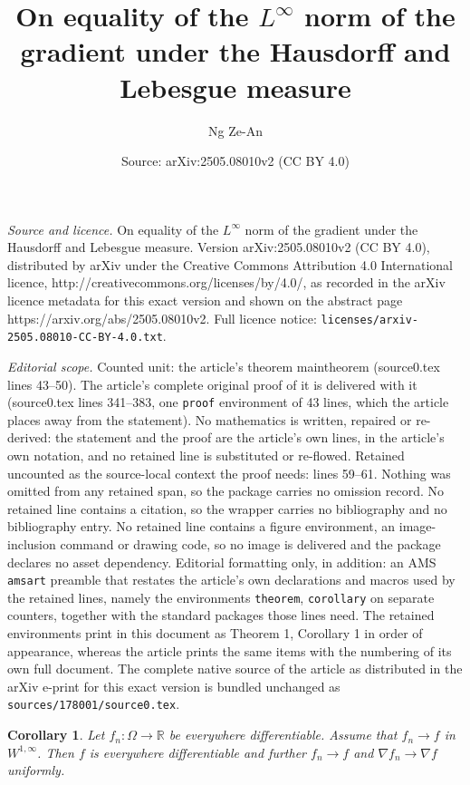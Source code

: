 \documentclass[10pt,a4paper]{amsart}
\title{On equality of the $L^\infty$ norm of the gradient under the Hausdorff and Lebesgue measure}
\author{Ng Ze-An}
\date{Source: arXiv:2505.08010v2 (CC BY 4.0)}
\newtheorem{corollary}{Corollary}
\begin{document}
\maketitle

\noindent\emph{Source and licence.} On equality of the $L^\infty$ norm of the gradient under the Hausdorff and Lebesgue measure. Version arXiv:2505.08010v2 (CC BY 4.0), distributed by arXiv under the Creative Commons Attribution 4.0 International licence, http://creativecommons.org/licenses/by/4.0/, as recorded in the arXiv licence metadata for this exact version and shown on the abstract page https://arxiv.org/abs/2505.08010v2. Full licence notice: \texttt{licenses/arxiv-2505.08010-CC-BY-4.0.txt}.\par\smallskip

\noindent\textit{Editorial scope.} Counted unit: the article's theorem maintheorem (source0.tex lines 43--50). The article's complete original proof of it is delivered with it (source0.tex lines 341--383, one \texttt{proof} environment of 43 lines, which the article places away from the statement). No mathematics is written, repaired or re-derived: the statement and the proof are the article's own lines, in the article's own notation, and no retained line is substituted or re-flowed.  Retained uncounted as the source-local context the proof needs: lines 59--61.  Nothing was omitted from any retained span, so the package carries no omission record.  No retained line contains a citation, so the wrapper carries no bibliography and no bibliography entry.  No retained line contains a figure environment, an image-inclusion command or drawing code, so no image is delivered and the package declares no asset dependency.  Editorial formatting only, in addition: an AMS \texttt{amsart} preamble that restates the article's own declarations and macros used by the retained lines, namely the environments \texttt{theorem}, \texttt{corollary} on separate counters, together with the standard packages those lines need.  The retained environments print in this document as Theorem 1, Corollary 1 in order of appearance, whereas the article prints the same items with the numbering of its own full document.  The complete native source of the article as distributed in the arXiv e-print for this exact version is bundled unchanged as \texttt{sources/178001/source0.tex}.
\begin{corollary}\label{corollary2}
Let $f_n: \Omega \to \mathbb R$ be everywhere differentiable. Assume that $f_n \to f$ in $W^{1, \infty}$. Then $f$ is everywhere differentiable and further $f_n \to f$ and $\nabla f_n \to \nabla f$ uniformly.
\end{corollary}
\end{document}
